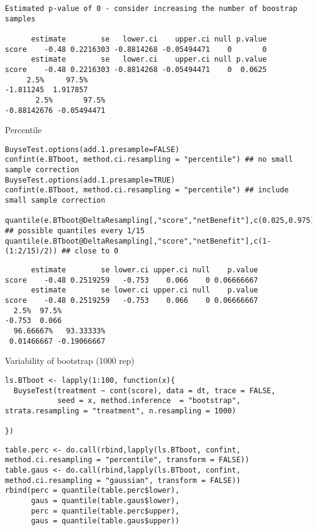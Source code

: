 \documentclass[12pt]{article}
\begin{document}
\begin{verbatim}
Estimated p-value of 0 - consider increasing the number of boostrap samples 

      estimate        se   lower.ci    upper.ci null p.value
score    -0.48 0.2216303 -0.8814268 -0.05494471    0       0
      estimate        se   lower.ci    upper.ci null p.value
score    -0.48 0.2216303 -0.8814268 -0.05494471    0  0.0625
     2.5%     97.5% 
-1.811245  1.917857
       2.5%       97.5% 
-0.88142676 -0.05494471
\end{verbatim}

Percentile
\lstset{language=r,label= ,caption= ,captionpos=b,numbers=none}
\begin{lstlisting}
BuyseTest.options(add.1.presample=FALSE)
confint(e.BTboot, method.ci.resampling = "percentile") ## no small sample correction
BuyseTest.options(add.1.presample=TRUE)
confint(e.BTboot, method.ci.resampling = "percentile") ## include small sample correction 

quantile(e.BTboot@DeltaResampling[,"score","netBenefit"],c(0.025,0.975))
## possible quantiles every 1/15
quantile(e.BTboot@DeltaResampling[,"score","netBenefit"],c(1-(1:2/15)/2)) ## close to 0
\end{lstlisting}

\begin{verbatim}
      estimate        se lower.ci upper.ci null    p.value
score    -0.48 0.2519259   -0.753    0.066    0 0.06666667
      estimate        se lower.ci upper.ci null    p.value
score    -0.48 0.2519259   -0.753    0.066    0 0.06666667
  2.5%  97.5% 
-0.753  0.066
  96.66667%   93.33333% 
 0.01466667 -0.19066667
\end{verbatim}


Variability of bootstrap (1000 rep)
\lstset{language=r,label= ,caption= ,captionpos=b,numbers=none}
\begin{lstlisting}
ls.BTboot <- lapply(1:100, function(x){
  BuyseTest(treatment ~ cont(score), data = dt, trace = FALSE,
            seed = x, method.inference  = "bootstrap", strata.resampling = "treatment", n.resampling = 1000)
  
})
\end{lstlisting}

\lstset{language=r,label= ,caption= ,captionpos=b,numbers=none}
\begin{lstlisting}
table.perc <- do.call(rbind,lapply(ls.BTboot, confint, method.ci.resampling = "percentile", transform = FALSE))
table.gaus <- do.call(rbind,lapply(ls.BTboot, confint, method.ci.resampling = "gaussian", transform = FALSE))
rbind(perc = quantile(table.perc$lower),
      gaus = quantile(table.gaus$lower),
      perc = quantile(table.perc$upper),
      gaus = quantile(table.gaus$upper))
\end{lstlisting}
\end{document}
